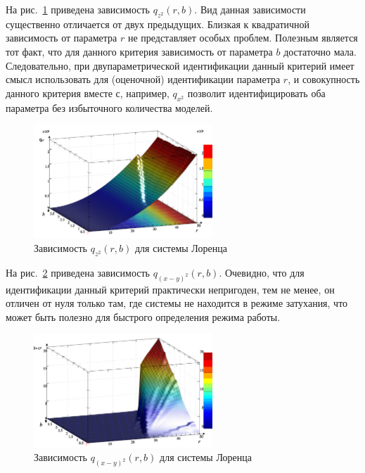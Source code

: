 На рис.~\ref{atu:f:lor_qz2_r_b} приведена зависимость
$q_{z^2}(r,b)$.
Вид данная зависимости существенно отличается от двух предыдущих.
Близкая к квадратичной зависимость от параметра $r$
не представляет особых проблем. Полезным является тот факт,
что для данного критерия зависимость от параметра $b$
достаточно мала. Следовательно, при двупараметрической идентификации
данный критерий имеет смысл  использовать для (оценочной)
идентификации параметра $r$, и совокупность данного критерия
вместе с, например, $q_{x^2}$ позволит идентифицировать
оба параметра без избыточного количества моделей.

\begin{figure}[h!]
  \centerline{  \includegraphics[width=0.60\textwidth]{p/cha/lor/q2d/lor_qz2_r_b.png}  }
  \caption{Зависимость $q_{z^2}(r,b)$ для системы Лоренца}
  \label{atu:f:lor_qz2_r_b}
\end{figure}

На рис.~\ref{atu:f:lor_qxmy2_r_b} приведена зависимость
$q_{(x-y)^2}(r,b)$.
Очевидно, что для идентификации данный критерий
практически непригоден, тем не менее,
он отличен от нуля только там, где системы не
находится в режиме затухания, что может быть полезно
для быстрого определения режима работы.

\begin{figure}[h!]
  \centerline{  \includegraphics[width=0.60\textwidth]{p/cha/lor/q2d/lor_qxmy2_r_b.png}  }
  \caption{Зависимость $q_{(x-y)^2}(r,b)$ для системы Лоренца}
  \label{atu:f:lor_qxmy2_r_b}
\end{figure}


